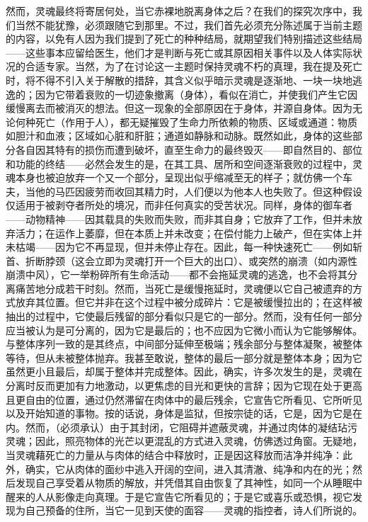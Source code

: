 然而，灵魂最终将寄居何处，当它赤裸地脱离身体之后？在我们的探究次序中，我们当然不能犹豫，必须跟随它到那里。不过，我们首先必须充分陈述属于当前主题的内容，以免有人因为我们提到了死亡的种种结局，就期望我们特别描述这些结局——这些事本应留给医生，他们才是判断与死亡或其原因相关事件以及人体实际状况的合适专家。当然，为了在讨论这一主题时保持灵魂不朽的真理，我在提及死亡时，将不得不引入关于解散的措辞，其含义似乎暗示灵魂是逐渐地、一块一块地逃逸的；因为它带着衰败的一切迹象撤离（身体），看似在消亡，并使我们产生它因缓慢离去而被消灭的想法。但这一现象的全部原因在于身体，并源自身体。因为无论何种死亡（作用于人），都无疑摧毁了生命力所依赖的物质、区域或通道：物质如胆汁和血液；区域如心脏和肝脏；通道如静脉和动脉。既然如此，身体的这些部分各自因其特有的损伤而遭到破坏，直至生命力的最终毁灭——即自然目的、部位和功能的终结——必然会发生的是，在其工具、居所和空间逐渐衰败的过程中，灵魂本身也被迫放弃一个又一个部分，呈现出似乎缩减至无的样子；就仿佛一个车夫，当他的马匹因疲劳而收回其精力时，人们便以为他本人也失败了。但这种假设仅适用于被剥夺者所处的境况，而非任何真实的受苦状况。同样，身体的御车者——动物精神——因其载具的失败而失败，而非其自身；它放弃了工作，但并未放弃活力；在运作上萎靡，但在本质上并未改变；在偿付能力上破产，但在实体上并未枯竭——因为它不再显现，但并未停止存在。因此，每一种快速死亡——例如斩首、折断脖颈（这会立即为灵魂打开一个巨大的出口）、或突然的崩溃（如内源性崩溃中风），它一举粉碎所有生命活动——都不会拖延灵魂的逃逸，也不会将其分离痛苦地分成若干时刻。然而，当死亡是缓慢拖延时，灵魂便以它自己被遗弃的方式放弃其位置。但它并非在这个过程中被分成碎片：它是被缓慢拉出的；在这样被抽出的过程中，它使最后残留的部分看似只是它的一部分。然而，没有任何一部分应当被认为是可分离的，因为它是最后的；也不应因为它微小而认为它能够解体。与整体序列一致的是其终点，中间部分延伸至极端；残余部分与整体凝聚，被整体等待，但从未被整体抛弃。我甚至敢说，整体的最后一部分就是整体本身；因为它虽然更小且最后，却属于整体并完成整体。因此，确实，许多次发生的是，灵魂在分离时反而更加有力地激动，以更焦虑的目光和更快的言辞；因为它现在处于更高且更自由的位置，通过仍然滞留在肉体中的最后残余，它宣告它所看见、它所听见以及开始知道的事物。按的话说，身体是监狱，但按宗徒的话，它是，因为它是在内。然而，（必须承认）由于其封闭，它阻碍并遮蔽灵魂，并通过肉体的凝结玷污灵魂；因此，照亮物体的光芒以更混乱的方式进入灵魂，仿佛透过角窗。无疑地，当灵魂藉死亡的力量从与肉体的结合中释放时，正是因这释放而洁净并纯净：此外，确实，它从肉体的面纱中逃入开阔的空间，进入其清澈、纯净和内在的光；然后发现自己享受着从物质的解放，并凭借其自由恢复了其神性，如同一个从睡眠中醒来的人从影像走向真理。于是它宣告它所看见的；于是它或喜乐或恐惧，视它发现为自己预备的住所，当它一见到天使的面容——灵魂的指控者，诗人们所说的。\par

